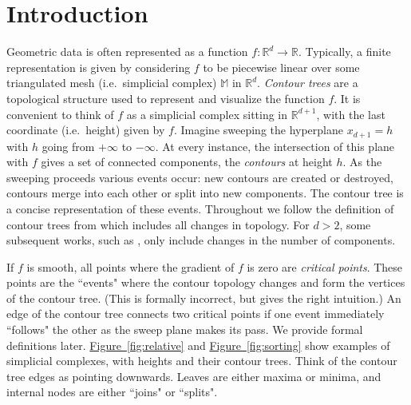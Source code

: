 \documentclass[11pt]{article}
\theoremstyle{definition}
\newcommand{\MM}{\mathbb{M}}
\newcommand{\RR}{\mathbb{R}}
\newcommand{\Fig}[1]{\hyperref[fig:#1]{Figure~\ref*{fig:#1}}} %
\begin{document}
\newpage
{}

\section{Introduction}

Geometric data is often represented as a function $f: \RR^d \to \RR$. Typically, a finite representation is given
by considering $f$ to be piecewise linear over some triangulated mesh (i.e.\ simplicial complex) $\MM$ in $\RR^d$.
\emph{Contour trees} are a topological structure used to represent and visualize
the function $f$. 
It is convenient to think of $f$ as a simplicial complex sitting in $\RR^{d+1}$,
with the last coordinate (i.e.\ height) given by $f$. Imagine sweeping the hyperplane $x_{d+1} = h$
with $h$ going from $+\infty$ to $-\infty$. At every instance, the intersection of this plane 
with $f$ gives a set of connected components, the \emph{contours} at height $h$. As the sweeping 
proceeds various events occur: new contours are created or destroyed, contours merge into each other or
split into new components. 
The contour tree is a concise representation of these events.
Throughout we follow the definition of contour trees from \cite{kobps-ctsssit-97} which includes all changes in topology.  
For $d>2$, some subsequent works, such as \cite{csa-cctad-03}, only include changes in the number of components.

If $f$ is smooth, all points where the gradient of $f$ is zero are \emph{critical points}.
These points are the ``events" where the contour topology changes and form the vertices of the contour tree. 
(This is formally incorrect, but gives the right intuition.)
An edge of the contour tree connects two critical points if one event immediately ``follows"
the other as the sweep plane makes its pass. We provide formal definitions later. 
\Fig{relative} and \Fig{sorting} 
show examples of simplicial complexes, with heights and their contour trees.
Think of the contour tree edges as pointing downwards. Leaves are either maxima or minima,
and internal nodes are either ``joins" or ``splits".

\end{document}
